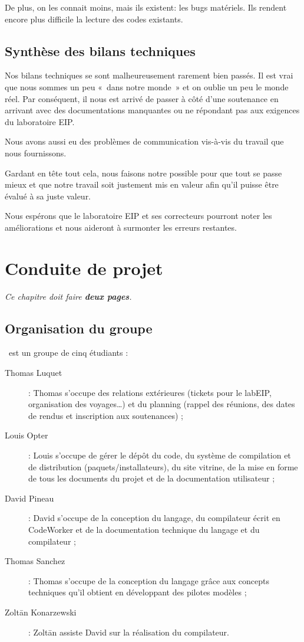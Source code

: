 \documentclass[francais]{rtxreport}
\begin{document}
De plus, on les connait moins, mais ils existent: les bugs matériels. Ils
rendent encore plus difficile la lecture des codes existants.

\section{Synthèse des bilans techniques}

Nos bilans techniques se sont malheureusement rarement bien passés. Il est vrai
que nous sommes un peu «~dans notre monde~» et on oublie un peu le monde réel.
Par conséquent, il nous est arrivé de passer à côté d’une soutenance en arrivant
avec des documentations manquantes ou ne répondant pas aux exigences du
laboratoire EIP.

Nous avons aussi eu des problèmes de communication vis-à-vis du travail que nous
fournissons.

Gardant en tête tout cela, nous faisons notre possible pour que tout se passe
mieux et que notre travail soit justement mis en valeur afin qu’il puisse être
évalué à sa juste valeur.

Nous espérons que le laboratoire EIP et ses correcteurs pourront noter les
améliorations et nous aideront à surmonter les erreurs restantes.

\chapter{Conduite de projet}

\emph{Ce chapitre doit faire \textbf{deux pages}.}

\section{Organisation du groupe}

\rtx\ est un groupe de cinq étudiants :
\begin{description}
\item[Thomas Luquet] : Thomas s'occupe des relations extérieures (tickets pour
  le labEIP, organisation des voyages\ldots) et du planning (rappel des
  réunions, des dates de rendus et inscription aux soutenances) ;
\item[Louis Opter] : Louis s'occupe de gérer le dépôt du code, du système de
  compilation et de distribution (paquets/installateurs), du site vitrine, de la
  mise en forme de tous les documents du projet et de la documentation
  utilisateur ;
\item[David Pineau] : David s'occupe de la conception du langage, du compilateur
  écrit en CodeWorker et de la documentation technique du langage et du
  compilateur ;
\item[Thomas Sanchez] : Thomas s'occupe de la conception du langage grâce aux
  concepts techniques qu'il obtient en développant des pilotes modèles ;
\item[Zolt\={a}n Konarzewski] : Zolt\={a}n assiste David sur la réalisation du
  compilateur.
\end{description}
\end{document}
